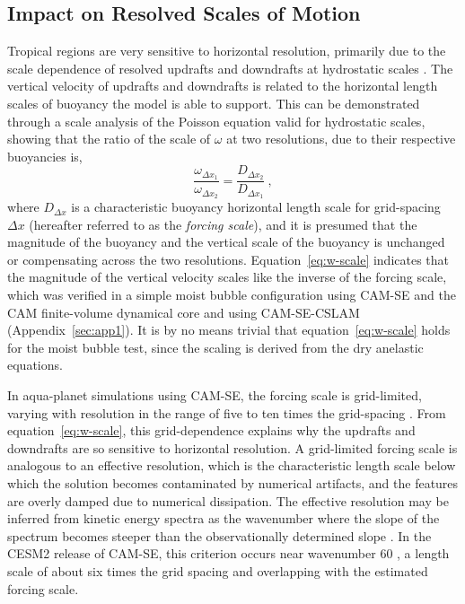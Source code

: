 \documentclass{agujournal}
\begin{document}
\subsection{Impact on Resolved Scales of Motion}\label{sec:aquaplanet}

Tropical regions are very sensitive to horizontal resolution, primarily due to the scale dependence of resolved updrafts and downdrafts at hydrostatic scales \citep{HR2017JCLIM,HR2018JAMES}. The vertical velocity of updrafts and downdrafts is related to the horizontal length scales of buoyancy the model is able to support. This can be demonstrated through a scale analysis of the Poisson equation \citep{JR2016QJRMS} valid for hydrostatic scales, showing that the ratio of the scale of $\omega$ at two resolutions, due to their respective buoyancies is,
\begin{equation}
\frac{\omega_{\Delta x_1}}{\omega_{\Delta x_2}} =  \frac{D_{\Delta x_2}}{D_{\Delta x_1}}~,\label{eq:w-scale}
\end{equation}
where $D_{\Delta x}$ is a characteristic buoyancy horizontal length scale for grid-spacing $\Delta x$ (hereafter referred to as the {\em{forcing scale}}), and it is presumed that the magnitude of the buoyancy and the vertical scale of the buoyancy is unchanged or compensating across the two resolutions. Equation~\eqref{eq:w-scale} indicates that the magnitude of the vertical velocity scales like the inverse of the forcing scale, which was verified in a simple moist bubble configuration using CAM-SE and the CAM finite-volume dynamical core \citep{HR2018JAMES} and using CAM-SE-CSLAM (Appendix~\ref{sec:app1}). It is by no means trivial that equation~\eqref{eq:w-scale} holds for the moist bubble test, since the scaling is derived from the dry anelastic equations.

In aqua-planet simulations using CAM-SE, the forcing scale is grid-limited, varying with resolution in the range of five to ten times the grid-spacing \citep{HR2018JAMES}. From equation~\eqref{eq:w-scale}, this grid-dependence explains why the updrafts and downdrafts are so sensitive to horizontal resolution. A grid-limited forcing scale is analogous to an effective resolution, which is the characteristic length scale below which the solution becomes contaminated by numerical artifacts, and the features are overly damped due to numerical dissipation. The effective resolution may be inferred from kinetic energy spectra as the wavenumber where the slope of the spectrum becomes steeper than the observationally determined slope \citep{S2011LNCSE}. In the CESM2 release of CAM-SE, this criterion occurs near wavenumber 60 \citep[see Figure 6 in][]{LetAl2018JAMES}, a length scale of about six times the grid spacing and overlapping with the estimated forcing scale.
\end{document}
